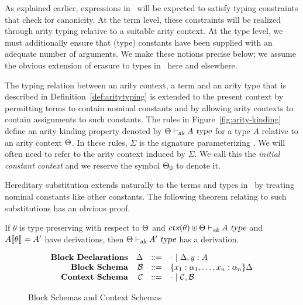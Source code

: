 As explained earlier, expressions in \logic\ will be expected to
satisfy typing constraints that check for canonicity.
%
At the term level, these constraints will be realized through arity
typing relative to a suitable arity context.
%
At the type level, we must additionally ensure that (type) constants
have been supplied with an adequate number of arguments.
%
We make these notions precise below; we assume the obvious extension
of erasure to types in \logic\ here and elsewhere.
%
\begin{definition}
The typing relation between an arity context, a term and an arity type
that is described in Definition~\ref{def:aritytyping} is extended to
the present context by permitting terms to contain nominal constants
and by allowing arity contexts to contain assignments to such
constants.
%
The rules in Figure~\ref{fig:arity-kinding} define an arity kinding
property denoted by $\Theta \vdash_{\mbox{\sl \scriptsize ak}} A\ \mbox{\sl type}$ for a type $A$ relative to
an arity context $\Theta$.
%
In these rules, $\Sigma$ is the signature parameterizing \logic.
%
We will often need to refer to the arity context induced by $\Sigma$.
%
We call this the \emph{initial constant context} and we reserve the symbol
$\Theta_0$ to denote it.
\end{definition}

Hereditary substitution extends naturally to the terms and types in
\logic\ by treating nominal constants like other constants.
%
The following theorem relating to such substitutions has an obvious
proof.  

\begin{theorem}\label{th:aritysubs-ty}
If $\theta$ is type preserving with respect to $\Theta$ and
$\mbox{\sl ctx}(\theta) \uplus \Theta \vdash_{\mbox{\sl \scriptsize ak}} A\ \mbox{\sl type}$ and
$A\llbracket {\theta} \rrbracket_{} = A'$ have derivations, then
$\Theta \vdash_{\mbox{\sl \scriptsize ak}} A'\ \mbox{\sl type}$ has a derivation.
\end{theorem}

\begin{figure}[tbhp]
  \[\begin{array}{rrcl}
\mbox{\bf Block Declarations} & \Delta & ::= & \emptybb\ \vert\ \Delta, y : A \\
\mbox{\bf Block Schema}   & \mathcal{B} & ::= & \{x_1:\alpha_1,\ldots, x_n:\alpha_n\}\Delta\\
\mbox{\bf Context Schema} & \mathcal{C} & ::= & \emptycs\ \vert\ \mathcal{C}, \mathcal{B}
\end{array}\]
\caption{Block Schemas and Context Schemas}
\label{fig:context-schemas}
\end{figure}


